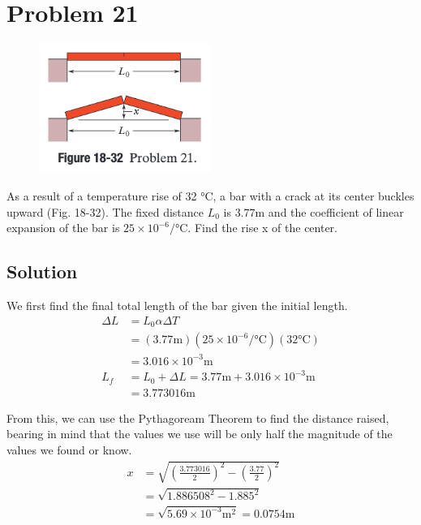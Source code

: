\documentclass[12pt]{article}
\begin{document}
    \pagebreak
    \section{Problem 21}
        \begin{figure}
            \vspace{-30pt}
            \includegraphics[width=0.5\textwidth]{picture_18-32.png} 
        \end{figure}
        As a result of a temperature rise of 32 \unit{\celsius}, a bar with a crack at its center buckles upward (Fig. 18-32). The fixed distance $L_0$ is $3.77 \unit{\meter}$ and the coefficient of linear expansion of the bar is $25 \times 10^{-6}/\unit{\celsius}$. Find the rise x of the center.

        \subsection{Solution}
            We first find the final total length of the bar given the initial length.
            \begin{align}
                \Delta L &= L_0 \alpha \Delta T\\
                    &=  (3.77 \unit{\meter}) (25 \times 10^{-6}/\unit{\celsius}) (32 \unit{\celsius})\\
                    &=  3.016 \times 10^{-3} \unit{\meter}\\
                L_f &=  L_0 + \Delta L
                    =   3.77 \unit{\meter} + 3.016 \times 10^{-3} \unit{\meter}\\
                    &=  3.773016 \unit{\meter}
            \end{align}

            From this, we can use the Pythagoream Theorem to find the distance raised, bearing in mind that the values we use will be only half the magnitude of the values we found or know.
            \begin{align}
                x   &=  \sqrt{\left(\frac{3.773016}{2}\right)^2 - \left(\frac{3.77}{2}\right)^2}\\
                    &=  \sqrt{1.886508^2 - 1.885^2}\\
                    &=  \sqrt{5.69 \times 10^{-3} \unit{\meter^2}}
                    =   \boxed{0.0754 \unit{\meter}}
            \end{align}
\end{document}
